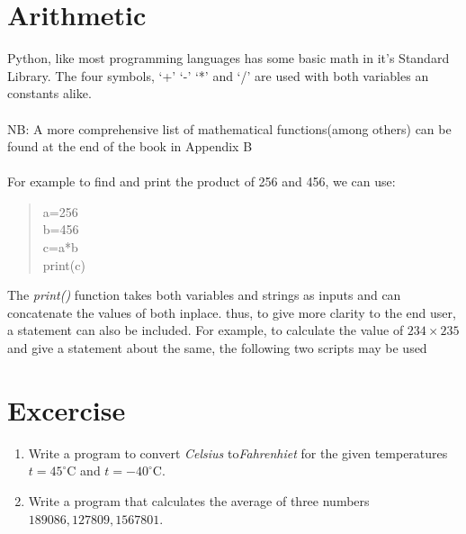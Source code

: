 \section{Arithmetic}
Python, like most programming languages has some basic math in it's Standard Library. The four symbols, `+' `-' `*' and `/' are used with both variables an constants alike.
\\ \\ NB: A more comprehensive list of mathematical functions(among others) can be found at the end of the book in Appendix B\\ \\
 For example to find and print the product of 256 and 456, we can use:
\begin{quote}
a=256\\b=456\\c=a*b\\print(c)
\end{quote}
The  \emph{print()} function takes both variables and strings as inputs and can concatenate the values of both inplace. thus, to give more clarity to the end user, a statement can also be included. For example, to calculate the value of $234\times 235$ and give a statement about the same, the following two scripts may be used
\newpage	
\section{Excercise}
\begin{enumerate}
\item Write a program to convert \emph{Celsius} to\emph{Fahrenhiet} for the given temperatures $t=45^{\circ}$C and $t=-40^{\circ}$C.
\item Write a program that calculates the average of three numbers $189086,127809,1567801$.
\end{enumerate}

